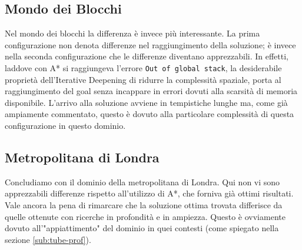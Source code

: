 \subsection{Mondo dei Blocchi}
Nel mondo dei blocchi la differenza è invece più interessante. La prima configurazione non denota differenze nel raggiungimento della soluzione; è invece nella seconda configurazione che le differenze diventano apprezzabili. In effetti, laddove con A* si raggiungeva l'errore \texttt{Out of global stack}, la desiderabile proprietà dell'Iterative Deepening di ridurre la complessità spaziale, porta al raggiungimento del goal senza incappare in errori dovuti alla scarsità di memoria disponibile.
L'arrivo alla soluzione avviene in tempistiche lunghe ma, come già ampiamente commentato, questo è dovuto alla particolare complessità di questa configurazione in questo dominio.

\subsection{Metropolitana di Londra}
Concludiamo con il dominio della metropolitana di Londra. Qui non vi sono apprezzabili differenze rispetto all'utilizzo di A*, che forniva già ottimi risultati. Vale ancora la pena di rimarcare che la soluzione ottima trovata differisce da quelle ottenute con ricerche in profondità e in ampiezza. Questo è ovviamente dovuto all'"appiattimento" del dominio in quei contesti (come spiegato nella sezione \ref{sub:tube-prof}).
